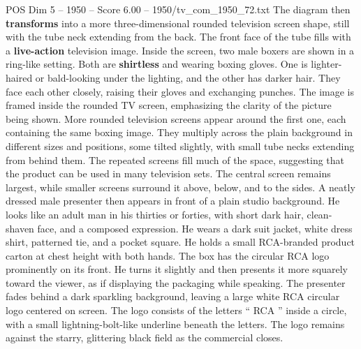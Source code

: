 \begin{textsample}{POS Dim 5 – 1950 – Score 6.00 – 1950/tv\_com\_1950\_72.txt}
The diagram then \textbf{transforms} into a more three-dimensional rounded television screen shape, still with the tube neck extending from the back.
The front face of the tube fills with a \textbf{live-action} television image.
Inside the screen, two male boxers are shown in a ring-like setting.
Both are \textbf{shirtless} and wearing boxing gloves.
One is lighter-haired or bald-looking under the lighting, and the other has darker hair.
They face each other closely, raising their gloves and exchanging punches.
The image is framed inside the rounded TV screen, emphasizing the clarity of the picture being shown.
More rounded television screens appear around the first one, each containing the same boxing image.
They multiply across the plain background in different sizes and positions, some tilted slightly, with small tube necks extending from behind them.
The repeated screens fill much of the space, suggesting that the product can be used in many television sets.
The central screen remains largest, while smaller screens surround it above, below, and to the sides.
A neatly dressed male presenter then appears in front of a plain studio background.
He looks like an adult man in his thirties or forties, with short dark hair, clean-shaven face, and a composed expression.
He wears a dark suit jacket, white dress shirt, patterned tie, and a pocket square.
He holds a small RCA-branded product carton at chest height with both hands.
The box has the circular RCA logo prominently on its front.
He turns it slightly and then presents it more squarely toward the viewer, as if displaying the packaging while speaking.
The presenter fades behind a dark sparkling background, leaving a large white RCA circular logo centered on screen.
The logo consists of the letters “ RCA ” inside a circle, with a small lightning-bolt-like underline beneath the letters.
The logo remains against the starry, glittering black field as the commercial closes.

\end{textsample}
